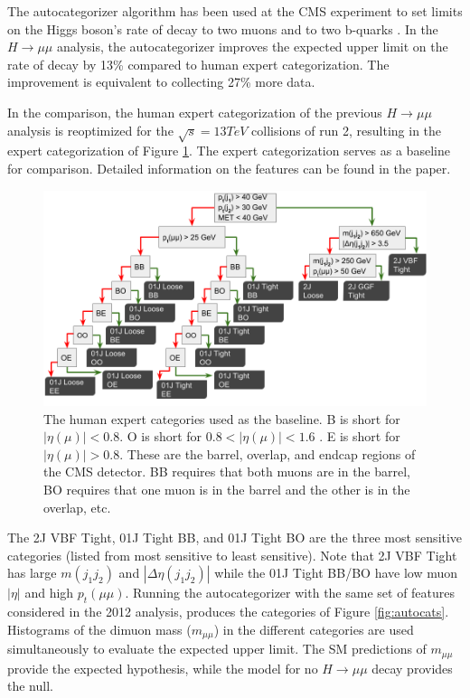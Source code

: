 \documentclass[review]{elsarticle}
\begin{document}
The autocategorizer algorithm has been used at the CMS experiment to set limits on the Higgs boson's rate of decay to two muons \cite{cmshiggsmumu2017} and to two b-quarks \cite{VHbbCitation}. In the $H\rightarrow\mu\mu$ analysis, the autocategorizer improves the expected upper limit on the rate of decay by 13\% compared to human expert categorization. The improvement is equivalent to collecting 27\% more data. 

In the comparison, the human expert categorization of the previous $H\rightarrow\mu\mu$ analysis \cite{cmshiggsmumu2012} is reoptimized for the $\sqrt{s} = 13 TeV$ collisions of run 2, resulting in the expert categorization of Figure \ref{fig:hxcats}. The expert categorization serves as a baseline for comparison. Detailed information on the features can be found in the paper. 
\begin{figure}[h!]
  \centering
  \includegraphics[width=0.98\linewidth]{run1categories.png}
  \caption
  {The human expert categories used as the baseline. B is short for $|\eta(\mu)| < 0.8$. O is short for $0.8 < |\eta(\mu)| < 1.6$ . E is short for $|\eta(\mu)| > 0.8$. These are the barrel, overlap, and endcap regions of the CMS detector. BB requires that both muons are in the barrel, BO requires that one muon is in the barrel and the other is in the overlap, etc.}
  \label{fig:hxcats}
\end{figure}
The 2J VBF Tight, 01J Tight BB, and 01J Tight BO are the three most sensitive categories (listed from most sensitive to least sensitive). Note that 2J VBF Tight has large $m(j_1j_2)$ and $|\Delta\eta(j_1j_2)|$ while the 01J Tight BB/BO have low muon $|\eta|$ and high $p_t(\mu\mu)$. 
\FloatBarrier
Running the autocategorizer with the same set of features considered in the 2012 analysis, produces the categories of Figure \ref{fig:autocats}. Histograms of the dimuon mass ($m_{\mu\mu}$) in the different categories are used simultaneously to evaluate the expected upper limit. The SM predictions of $m_{\mu\mu}$ provide the expected hypothesis, while the model for no $H\rightarrow\mu\mu$ decay provides the null. 
\end{document}
